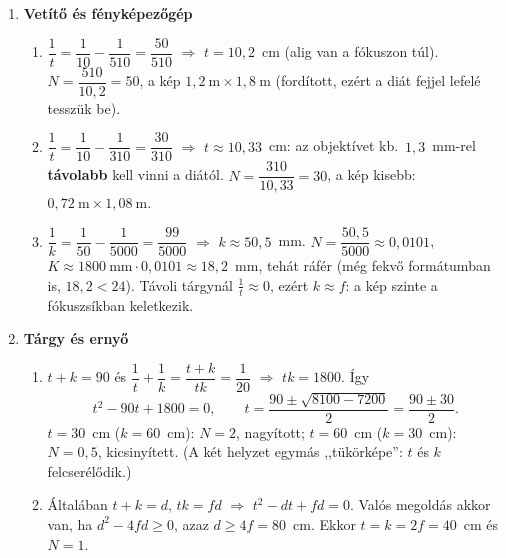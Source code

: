 \documentclass[11pt,a4paper]{article}
\begin{document}
\begin{enumerate}
\item \textbf{Vetítő és fényképezőgép}
  \begin{enumerate}
    \item $\dfrac1t = \dfrac1{10} - \dfrac1{510} = \dfrac{50}{510}$ $\Rightarrow$
      $t = 10{,}2$~cm (alig van a fókuszon túl). $N = \dfrac{510}{10{,}2} = 50$, a kép
      $1{,}2~\text{m} \times 1{,}8~\text{m}$ (fordított, ezért a diát fejjel lefelé tesszük be).
    \item $\dfrac1t = \dfrac1{10} - \dfrac1{310} = \dfrac{30}{310}$ $\Rightarrow$
      $t \approx 10{,}33$~cm: az objektívet kb.\ $1{,}3$~mm-rel \textbf{távolabb} kell vinni
      a diától. $N = \dfrac{310}{10{,}33} = 30$, a kép kisebb:
      $0{,}72~\text{m} \times 1{,}08~\text{m}$.
    \item $\dfrac1k = \dfrac1{50} - \dfrac1{5000} = \dfrac{99}{5000}$ $\Rightarrow$
      $k \approx 50{,}5$~mm. $N = \dfrac{50{,}5}{5000} \approx 0{,}0101$,
      $K \approx 1800~\text{mm}\cdot 0{,}0101 \approx 18{,}2$~mm, tehát ráfér (még fekvő
      formátumban is, $18{,}2 < 24$). Távoli tárgynál $\tfrac1t \approx 0$, ezért
      $k \approx f$: a kép szinte a fókuszsíkban keletkezik.
  \end{enumerate}

\item \textbf{Tárgy és ernyő}
  \begin{enumerate}
    \item $t + k = 90$ és $\dfrac1t + \dfrac1k = \dfrac{t+k}{tk} = \dfrac1{20}$
      $\Rightarrow$ $tk = 1800$. Így
      \[ t^2 - 90t + 1800 = 0, \qquad t = \frac{90 \pm \sqrt{8100 - 7200}}{2} = \frac{90 \pm 30}{2}. \]
      $t = 30$~cm ($k = 60$~cm): $N = 2$, nagyított; \quad $t = 60$~cm ($k = 30$~cm):
      $N = 0{,}5$, kicsinyített. (A két helyzet egymás ,,tükörképe'': $t$ és $k$ felcserélődik.)
    \item Általában $t + k = d$, $tk = fd$ $\Rightarrow$ $t^2 - dt + fd = 0$. Valós megoldás
      akkor van, ha $d^2 - 4fd \ge 0$, azaz $d \ge 4f = 80$~cm. Ekkor
      $t = k = 2f = 40$~cm és $N = 1$.
  \end{enumerate}


\end{enumerate}
\end{document}
